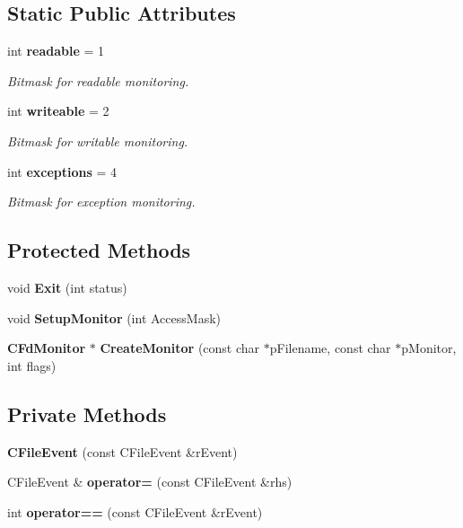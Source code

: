 \subsection*{Static Public Attributes}
\begin{CompactItemize}
\item 
int {\bf readable} = 1
\begin{CompactList}\small\item\em Bitmask for readable monitoring.\item\end{CompactList}\item 
int {\bf writeable} = 2
\begin{CompactList}\small\item\em Bitmask for writable monitoring.\item\end{CompactList}\item 
int {\bf exceptions} = 4
\begin{CompactList}\small\item\em Bitmask for exception monitoring.\item\end{CompactList}\end{CompactItemize}
\subsection*{Protected Methods}
\begin{CompactItemize}
\item 
void {\bf Exit} (int status)
\item 
void {\bf Setup\-Monitor} (int Access\-Mask)
\item 
{\bf CFd\-Monitor} $\ast$ {\bf Create\-Monitor} (const char $\ast$p\-Filename, const char $\ast$p\-Monitor, int flags)
\end{CompactItemize}
\subsection*{Private Methods}
\begin{CompactItemize}
\item 
{\bf CFile\-Event} (const CFile\-Event \&r\-Event)
\item 
CFile\-Event \& {\bf operator=} (const CFile\-Event \&rhs)
\item 
int {\bf operator==} (const CFile\-Event \&r\-Event)
\end{CompactItemize}

